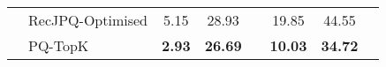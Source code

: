 \begin{tabular}{|l|l|cccccc|}
                               & RecJPQ-Optimised    & 5.15                                                    & 28.93                                                 & \multicolumn{1}{l|}{}                                                                                               & 19.85                                                   & 44.55                                                 &                                                                                                \\
                               & PQ-TopK             & \textbf{2.93}                                           & \textbf{26.69}                                        & \multicolumn{1}{l|}{}                                                                                               & \textbf{10.03}                                          & \textbf{34.72}                                        &                                                                                                \\ \hline
    \end{tabular}